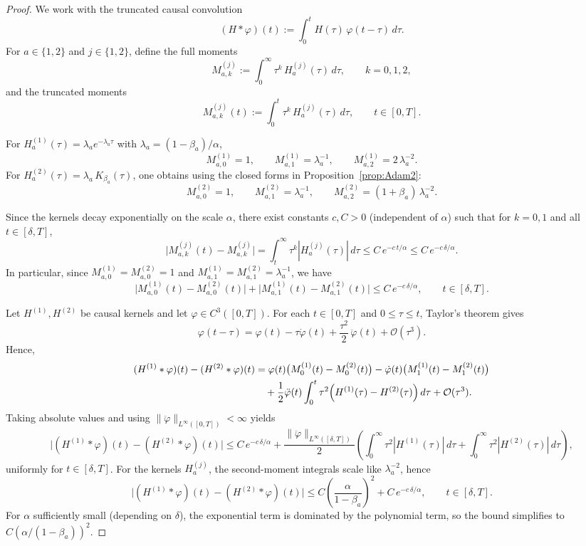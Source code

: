\documentclass{article} %
\begin{document}
\begin{proof}
We work with the truncated causal convolution
\[
(H*\varphi)(t):=\int_0^t H(\tau)\,\varphi(t-\tau)\,d\tau.
\]
For $a\in\{1,2\}$ and $j\in\{1,2\}$, define the full moments
\[
M^{(j)}_{a,k}:=\int_0^\infty \tau^k\,H^{(j)}_a(\tau)\,d\tau,\qquad k=0,1,2,
\]
and the truncated moments
\[
M^{(j)}_{a,k}(t):=\int_0^t \tau^k\,H^{(j)}_a(\tau)\,d\tau,\qquad t\in[0,T].
\]

For $H^{(1)}_a(\tau)=\lambda_a e^{-\lambda_a\tau}$ with $\lambda_a=(1-\beta_a)/\alpha$,
\[
M^{(1)}_{a,0}=1,\qquad
M^{(1)}_{a,1}=\lambda_a^{-1},\qquad
M^{(1)}_{a,2}=2\,\lambda_a^{-2}.
\]
For $H^{(2)}_a(\tau)=\lambda_a\,K_{\beta_a}(\tau)$, one obtains using the closed forms in Proposition~\ref{prop:Adam2}:
\[
M^{(2)}_{a,0}=1,\qquad
M^{(2)}_{a,1}=\lambda_a^{-1},\qquad
M^{(2)}_{a,2}=(1+\beta_a)\,\lambda_a^{-2}.
\]

Since the kernels decay exponentially on the scale $\alpha$, there exist constants $c,C>0$
(independent of $\alpha$) such that for $k=0,1$ and all $t\in[\delta,T]$,
\[
\bigl|M^{(j)}_{a,k}(t)-M^{(j)}_{a,k}\bigr|
=\int_t^\infty \tau^k |H^{(j)}_a(\tau)|\,d\tau
\le C\,e^{-c\,t/\alpha}
\le C\,e^{-c\,\delta/\alpha}.
\]
In particular, since $M^{(1)}_{a,0}=M^{(2)}_{a,0}=1$ and $M^{(1)}_{a,1}=M^{(2)}_{a,1}=\lambda_a^{-1}$,
we have
\[
\bigl|M^{(1)}_{a,0}(t)-M^{(2)}_{a,0}(t)\bigr|
+\bigl|M^{(1)}_{a,1}(t)-M^{(2)}_{a,1}(t)\bigr|
\le C\,e^{-c\,\delta/\alpha},
\qquad t\in[\delta,T].
\]

Let $H^{(1)},H^{(2)}$ be causal kernels and let $\varphi\in C^3([0,T])$.
For each $t\in[0,T]$ and $0\le \tau\le t$, Taylor's theorem gives
\[
\varphi(t-\tau)=\varphi(t)-\tau \dot\varphi(t)+\frac{\tau^2}{2}\,\ddot \varphi(t) + \mathcal{O}(\tau^3).
\]
Hence, 
\begin{align*}
(H^{(1)}*\varphi)(t)-(H^{(2)}*\varphi)(t)
&=\varphi(t)\bigl(M^{(1)}_0(t)-M^{(2)}_0(t)\bigr)
-\dot\varphi(t)\bigl(M^{(1)}_1(t)-M^{(2)}_1(t)\bigr)\\
&\quad+\frac12 \ddot\varphi(t)\int_0^t \tau^2\Bigl(H^{(1)}(\tau)-H^{(2)}(\tau)\Bigr)\,d\tau + \mathcal{O}(\tau^3).
\end{align*}
Taking absolute values and using $\|\ddot\varphi\|_{L^\infty([0,T])}<\infty$ yields
\[
\bigl|(H^{(1)}*\varphi)(t)-(H^{(2)}*\varphi)(t)\bigr|
\le C\,e^{-c\,\delta/\alpha}
+\frac{\|\ddot\varphi\|_{L^\infty([\delta,T])}}{2}
\left(\int_0^\infty \tau^2|H^{(1)}(\tau)|\,d\tau+\int_0^\infty \tau^2|H^{(2)}(\tau)|\,d\tau\right),
\]
uniformly for $t\in[\delta,T]$. For the kernels $H^{(j)}_a$, the second-moment integrals scale like $\lambda_a^{-2}$, hence
\[
\bigl|(H^{(1)}*\varphi)(t)-(H^{(2)}*\varphi)(t)\bigr|
\le C\left(\frac{\alpha}{1-\beta_a}\right)^2 + C\,e^{-c\,\delta/\alpha},
\qquad t\in[\delta,T].
\]
For $\alpha$ sufficiently small (depending on $\delta$), the exponential term is dominated by the
polynomial term, so the bound simplifies to $C(\alpha/(1-\beta_a))^2$.


\end{proof}
\end{document}

